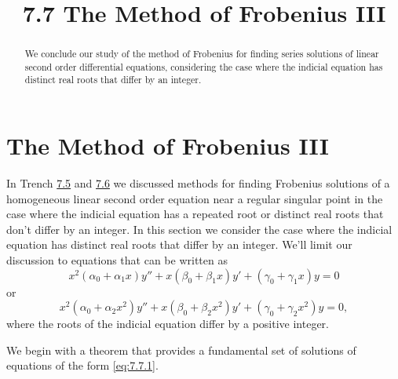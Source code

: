 \documentclass{ximera}
\title{7.7 The Method of Frobenius III}%
\begin{document}
\begin{abstract}
We conclude our study of the method of Frobenius for finding series solutions of linear second order differential equations, considering the case where the indicial equation has distinct real roots that differ by an integer.
\end{abstract}

\maketitle

\section*{The Method of Frobenius III}

In Trench \href{https://ximera.osu.edu/ode/main/frobeniusI/frobeniusI}{7.5} and \href{https://ximera.osu.edu/ode/main/frobeniusII/frobeniusII}{7.6} we discussed methods
for finding
Frobenius solutions of a homogeneous linear second order equation near
a regular singular point in the case where the indicial equation has a
repeated root or distinct real roots that don't differ by an integer.
In this section we consider the case where the indicial equation has
distinct real roots that differ by an integer. We'll limit our
discussion to equations that can be written as
\begin{equation} \label{eq:7.7.1}
x^2(\alpha_0+\alpha_1x)y''+x(\beta_0+\beta_1x)y'
+(\gamma_0+\gamma_1x)y=0
\end{equation}
or
$$
x^2(\alpha_0+\alpha_2x^2)y''+x(\beta_0+\beta_2x^2)y'
+(\gamma_0+\gamma_2x^2)y=0,
$$
where the roots of the indicial equation differ by a positive integer.

We begin with a theorem that provides a fundamental set of solutions
of equations of the form \eqref{eq:7.7.1}.
\end{document}

